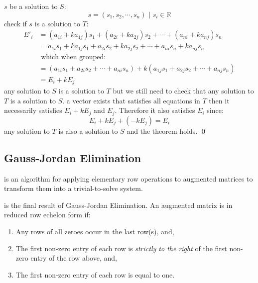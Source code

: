 \documentclass{tufte-book}
\begin{document}
 $s$ be a solution to $S$:
\begin{equation*}
	s=(s_1,s_2,\cdots,s_n) \text{ | } s_i \in \mathbb{R}
\end{equation*}
 check if $s$ is a solution to $T$:
\begin{align*}
	E'_i & = (a_{1i}+ka_{1j})s_1+(a_{2i}+ka_{2j})s_2+\cdots+(a_{ni}+ka_{nj})s_n             \\
	     & = a_{1i}s_1+ka_{1j}s_1+a_{2i}s_2+ka_{2j}s_2+\cdots+a_{ni}s_n+ka_{nj}s_n          \\
	     & \text{ which when grouped: }                                                     \\
	     & = (a_{1i}s_1+a_{2i}s_2+\cdots+a_{ni}s_n)+k(a_{1j}s_1+a_{2j}s_2+\cdots+a_{nj}s_n) \\
	     & = E_i + kE_j
\end{align*}
 any solution to $S$ is a solution to $T$ but we still need to check that any solution to $T$ is a
solution to $S$.
 a vector exists that satisfies all equations in $T$ then it necessarily satisfies $E_i+kE_j$ and
$E_j$. Therefore it also satisfies $E_i$ since:
\begin{equation*}
	E_i + kE_j + (-kE_j) = E_i
\end{equation*}
 any solution to $T$ is also a solution to $S$ and the theorem holds. \qed

\subsection{Gauss-Jordan Elimination}

 is an algorithm for applying elementary row operations to augmented
matrices to transform them into a trivial-to-solve system.

 is the final result of Gauss-Jordan Elimination. An augmented matrix is in
reduced row echelon form if:
\begin{enumerate}
	\item Any rows of all zeroes occur in the last row(s), and,
	\item The first non-zero entry of each row is
	      \emph{strictly to the right} of the first non-zero entry of the row above, and,
	\item The first non-zero entry of each row is equal to one.
\end{enumerate}
\end{document}
